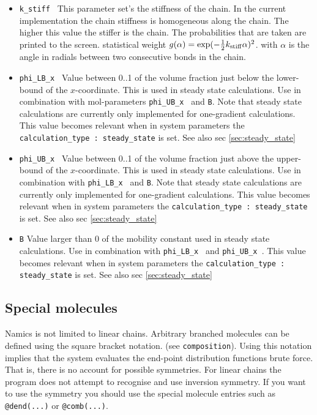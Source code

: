 \documentclass{article}
\begin{document}
\begin{itemize}
\item {\tt k\_stiff } This parameter set's the stiffness of the chain. In the current implementation the chain stiffness is homogeneous along the chain. The higher this value the stiffer is the chain. The probabilities that are taken are printed to the screen. statistical weight $g(\alpha)=\exp (-\frac{1}{2}k_{\rm stiff} \alpha)^2$. with $\alpha$ is the angle in radials between two consecutive bonds in the chain.

\item {\tt phi\_LB\_x } Value between 0..1 of the volume fraction just below the lower-bound of the $x$-coordinate. This is used in steady state calculations. Use in combination with mol-parameters {\tt phi\_UB\_x } and {\tt B}. Note that steady state calculations are currently only implemented for one-gradient calculations. This value becomes relevant when in system parameters the {\tt calculation\_type : steady\_state} is set. See also sec \ref{sec:steady_state}

\item {\tt phi\_UB\_x } Value between 0..1  of the volume fraction just above the upper-bound of the $x$-coordinate. This is used in steady state calculations. Use in combination with {\tt phi\_LB\_x } and {\tt B}. Note that steady state calculations are currently only implemented for one-gradient calculations. This value becomes relevant when in system parameters the {\tt calculation\_type : steady\_state} is set. See also sec \ref{sec:steady_state}

\item {\tt B} Value larger than 0 of the mobility constant used in steady state calculations. Use in combination with {\tt phi\_LB\_x } and {\tt phi\_UB\_x }. This value becomes relevant when in system parameters the {\tt calculation\_type : steady\_state} is set. See also sec \ref{sec:steady_state}


\end {itemize}

\subsection{Special molecules}
Namics is not limited to linear chains. Arbitrary branched molecules can be defined using the square bracket notation. (see {\tt composition}). Using this notation implies that the system evaluates the end-point distribution functions brute force. That is, there is no account for possible symmetries. For linear chains the program does not attempt to recognise and use inversion symmetry. If you want to use the symmetry you should use the special molecule entries such as {\tt @dend(...)} or {\tt @comb(...)}. 
\end{document}
